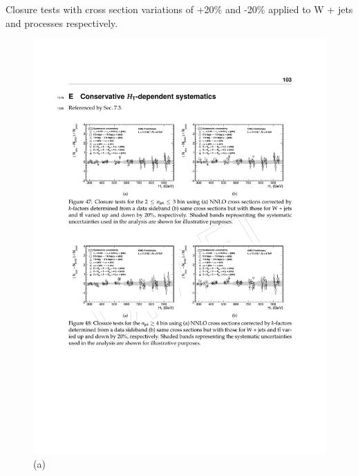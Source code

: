 Closure tests with cross section variations of +20\% and -20\% applied to W + jets and \ttbar processes respectively.

\begin{figure}[ht]
\centering
\begin{minipage}[b]{0.48 \linewidth}
\includegraphics[width = 1.0\linewidth]{plots/syst-le3j_nominal.pdf}
\centering
(a)  
\end{minipage}
\quad
\begin{minipage}[b]{0.48\linewidth}

\end{minipage}
\end{figure}
